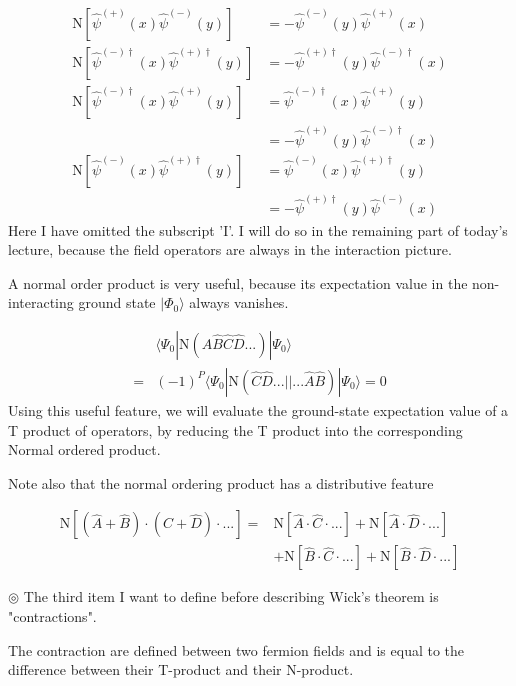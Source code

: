 ﻿\documentclass[twoside]{book}
\numberwithin{equation}{section}
\begin{document}
\begin{align}
\mathrm{N}[\hat \psi^{(+)}(x)\hat \psi^{(-)}(y)]&=-\hat \psi^{(-)}(y)\hat \psi^{(+)}(x) \nonumber \\
\mathrm{N}[\hat \psi^{(-)\dagger}(x)\hat \psi^{(+)\dagger}(y)]&=-\hat \psi^{(+)\dagger}(y)\hat \psi^{(-)\dagger}(x) \nonumber \\
\mathrm{N}[\hat \psi^{(-)\dagger}(x)\hat \psi^{(+)}(y)]&=\hat \psi^{(-)\dagger}(x)\hat \psi^{(+)}(y) \nonumber \\
&=-\hat \psi^{(+)}(y)\hat \psi^{(-)\dagger}(x) \nonumber \\
\mathrm{N}[\hat \psi^{(-)}(x)\hat \psi^{(+)\dagger}(y)]&=\hat \psi^{(-)}(x)\hat \psi^{(+)\dagger}(y) \nonumber \\
&=-\hat \psi^{(+)\dagger}(y)\hat \psi^{(-)}(x) \nonumber 
\end{align}
Here I have omitted the subscript 'I'. I will do so in the remaining part of today's lecture, because the field operators are always in the interaction picture.

A normal order product is very useful, because its expectation value in the non-interacting ground state $|\Phi_0\rangle$ always vanishes.

\begin{align}
&\langle\Psi_0|\mathrm{N}(\hat{A}\hat{B}\hat{C}\hat{D}...)|\Psi_0\rangle \nonumber \\
=&(-1)^P\langle\Psi_0|\mathrm{N}(\hat{C}\hat{D}...||...\hat{A}\hat{B})|\Psi_0\rangle=0 \nonumber
\end{align}
Using this useful feature, we will evaluate the ground-state expectation value of a T product of operators, by reducing the T product into the corresponding Normal ordered product.

Note also that the normal ordering product has a distributive feature

\begin{align}
\mathrm{N}[(\hat{A}+\hat{B})\cdot(\hat{C}+\hat{D})\cdot...]=&\mathrm{N}[\hat{A}\cdot\hat{C}\cdot...]+\mathrm{N}[\hat{A}\cdot\hat{D}\cdot...] \nonumber \\
&+\mathrm{N}[\hat{B}\cdot\hat{C}\cdot...]+\mathrm{N}[\hat{B}\cdot\hat{D}\cdot...] \nonumber
\end{align}

$\circledcirc$ The third item I want to define before describing Wick's theorem is "contractions". 


The contraction are defined between two fermion fields and is equal to the difference between their T-product and their N-product.
\end{document}
